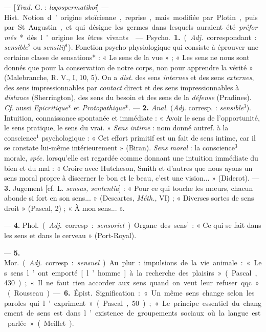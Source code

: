 \begin{itemize}[leftmargin=1cm, label=, itemsep=1pt]
 — [{\it Trad.} G. : {\it logospermatikoï}] —
\si{Hist.} Notion d’origine stoïcienne, reprise, mais modifiée par Plotin,
puis par St Augustin, et qui désigne les germes dans lesquels auraient été
{\it préformés}* dès l’origine les êtres vivants.

 — \si{Psycho.} {\bf 1.} ({\it Adj.} correspondant :
{\it sensible}$^2$ ou {\it sensitif}$^1$). Fonction psycho-physiologique qui
consiste à éprouver une certaine classe de sensations* : « Le sens de la vue
» ; « Les sens ne nous sont donnés que pour la conservation de notre corps,
non pour apprendre la vérité » (Malebranche, R. V., I, 10, 5). On a
{\it dist.} des sens {\it internes} et des sens {\it externes}, des sens
impressionnables par {\it contact} direct et des sens impressionnables à
{\it distance} (Sherrington), des sens du besoin et des sens de la
{\it défense} (Pradines). {\it Cf.} aussi {\it Epicritique}* et
{\it Protopathique}*. — {\bf 2.} {\it Anal.} ({\it Adj.} corresp. :
{\it sensible}$^3$). Intuition, connaissance spontanée et immédiate :
« Avoir le sens de l'opportunité, le sens pratique, le sens du vrai. »
{\it Sens intime} : nom donné autref. à la conscience$^1$ psychologique :
« Cet effort primitif est un fait de sens intime, car il se constate lui-même
intérieurement » (Biran). {\it Sens moral} : la conscience$^3$ morale,
{\it spéc.} lorsqu'elle est regardée comme donnant une intuition immédiate du
bien et du mal : « Croire avec Hutcheson, Smith et d'autres que nous ayons un
sens moral propre à discerner le bon et le beau, c'est une vision...
» (Diderot). —  {\bf 3.} Jugement [cf. L. {\it sensus, sententia}] : « Pour
ce qui touche les mœurs, chacun abonde si fort en son sens... » (Descartes,
{\it Méth.}, VI) ; « Diverses sortes de sens droit » (Pascal, 2) ; « À mon
sens... ».

— {\bf 4.} \si{Phol.} ({\it Adj.} corresp. : {\it sensoriel}). Organe des
sens$^1$ : « Ce qui se fait dans les sens et dans le cerveau » (Port-Royal).

— {\bf 5.} \si{Mor.} ({\it Adj.} corresp. : {\it sensuel}). Au plur. :
impulsions de la vie animale : « Les sens l’ont emporté [l’homme] à la
recherche des plaisirs » (Pascal, 430) ; «Il ne faut rien accorder aux sens
quand on veut leur refuser qqc. » (Rousseau).

— {\bf 6.} \si{Épist.} Signification : « Un même sens change selon les
paroles qui l’expriment » (Pascal, 50) ; « Le principe essentiel du
changement de sens est dans l’existence de groupements sociaux où la langue
est parlée » (Meillet).


\end{itemize}

